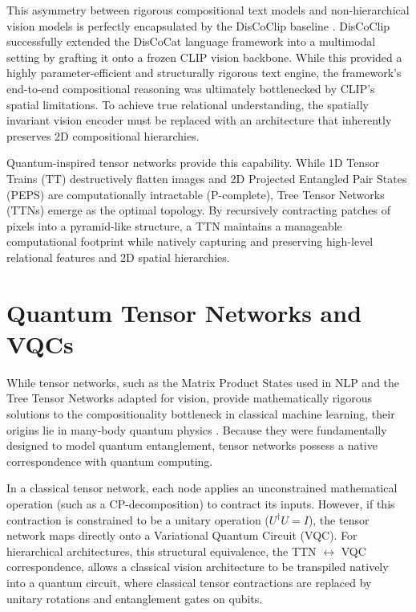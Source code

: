 \documentclass[12pt, a4paper, oneside]{report}
\begin{document}
This asymmetry between rigorous compositional text models and non-hierarchical vision models is perfectly encapsulated by the DisCoClip baseline \cite{discoclip}. DisCoClip successfully extended the DisCoCat language framework into a multimodal setting by grafting it onto a frozen CLIP vision backbone. While this provided a highly parameter-efficient and structurally rigorous text engine, the framework's end-to-end compositional reasoning was ultimately bottlenecked by CLIP's spatial limitations. To achieve true relational understanding, the spatially invariant vision encoder must be replaced with an architecture that inherently preserves 2D compositional hierarchies.

Quantum-inspired tensor networks provide this capability. While 1D Tensor Trains (TT) destructively flatten images and 2D Projected Entangled Pair States (PEPS) are computationally intractable (P-complete), Tree Tensor Networks (TTNs) \cite{ttn_images} emerge as the optimal topology. By recursively contracting patches of pixels into a pyramid-like structure, a TTN maintains a manageable computational footprint while natively capturing and preserving high-level relational features and 2D spatial hierarchies.

\section{Quantum Tensor Networks and VQCs}

While tensor networks, such as the Matrix Product States used in NLP and the Tree Tensor Networks adapted for vision, provide mathematically rigorous solutions to the compositionality bottleneck in classical machine learning, their origins lie in many-body quantum physics \cite{mps_physics}. Because they were fundamentally designed to model quantum entanglement, tensor networks possess a native correspondence with quantum computing.

In a classical tensor network, each node applies an unconstrained mathematical operation (such as a CP-decomposition) to contract its inputs. However, if this contraction is constrained to be a unitary operation ($U^{\dagger}U=I$), the tensor network maps directly onto a Variational Quantum Circuit (VQC). For hierarchical architectures, this structural equivalence, the TTN $\leftrightarrow$ VQC correspondence, allows a classical vision architecture to be transpiled natively into a quantum circuit, where classical tensor contractions are replaced by unitary rotations and entanglement gates on qubits.
\end{document}

